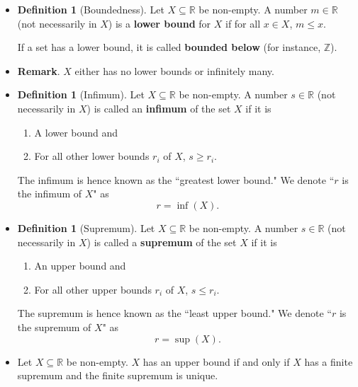 \documentclass{article}
\newcommand{\Z}{\mathbb{Z}}
\newcommand{\R}{\mathbb{R}}
\newcommand{\?}{\stackrel{?}{=}}
\theoremstyle{definition} %
\newtheorem{definition}[subsection]{Definition} %
\begin{document}
\begin{itemize}
    \item[]
          \begin{definition}[Boundedness]
              Let $X \subseteq \R$ be non-empty. A number $m \in \R$ (not necessarily in $X$) is a \textbf{lower bound} for $X$ if for all $x \in X$, $m \leq x$.
          \end{definition}
          If a set has a lower bound, it is called \textbf{bounded below} (for instance, $\Z$).
    \item \textbf{Remark}. $X$ either has no lower bounds or infinitely many.
    \item[]
          \begin{definition}[Infimum]
              Let $X \subseteq \R$ be non-empty. A number $s \in \R$ (not necessarily in $X$) is called an \textbf{infimum} of the set $X$ if it is
              \begin{enumerate}[label=(\arabic*)]
                  \item A lower bound and
                  \item For all other lower bounds $r_i$ of $X$, $s \geq r_i$.
              \end{enumerate}
              The infimum is hence known as the ``greatest lower bound." We denote ``$r$ is the infimum of $X$" as
              $$r = \inf(X).$$
          \end{definition}
    \item[]
          \begin{definition}[Supremum]
              Let $X \subseteq \R$ be non-empty. A number $s \in \R$ (not necessarily in $X$) is called a \textbf{supremum} of the set $X$ if it is
              \begin{enumerate}[label=(\arabic*)]
                  \item An upper bound and
                  \item For all other upper bounds $r_i$ of $X$, $s \leq r_i$.
              \end{enumerate}
              The supremum is hence known as the ``least upper bound." We denote ``$r$ is the supremum of $X$" as
              $$r = \sup(X).$$
          \end{definition}
    \item[]
          \begin{theorem}
              Let $X \subseteq \R$ be non-empty. $X$ has an upper bound if and only if $X$ has a finite supremum and the finite supremum is unique.

\end{theorem}
\end{itemize}
\end{document}
